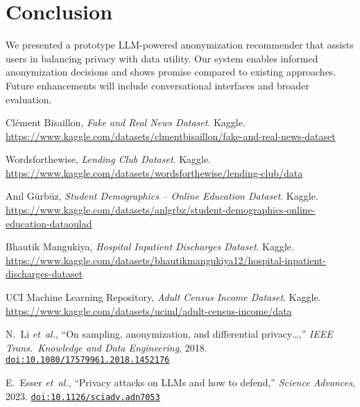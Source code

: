 \documentclass{article}
\begin{document}
\section{Conclusion}
We presented a prototype LLM-powered anonymization recommender that assists users in balancing privacy with data utility. Our system enables informed anonymization decisions and shows promise compared to existing approaches. Future enhancements will include conversational interfaces and broader evaluation.


\begin{thebibliography}{9}

Clément Bisaillon, 
\emph{Fake and Real News Dataset}. Kaggle. 
\href{https://www.kaggle.com/datasets/clmentbisaillon/fake-and-real-news-dataset}{https://www.kaggle.com/datasets/clmentbisaillon/fake-and-real-news-dataset}

Wordsforthewise, 
\emph{Lending Club Dataset}. Kaggle. 
\href{https://www.kaggle.com/datasets/wordsforthewise/lending-club/data}{https://www.kaggle.com/datasets/wordsforthewise/lending-club/data}

Anıl Gürbüz, 
\emph{Student Demographics – Online Education Dataset}. Kaggle. 
\href{https://www.kaggle.com/datasets/anlgrbz/student-demographics-online-education-dataoulad}{https://www.kaggle.com/datasets/anlgrbz/student-demographics-online-education-dataoulad}

Bhautik Mangukiya, 
\emph{Hospital Inpatient Discharges Dataset}. Kaggle. 
\href{https://www.kaggle.com/datasets/bhautikmangukiya12/hospital-inpatient-discharges-dataset}{https://www.kaggle.com/datasets/bhautikmangukiya12/hospital-inpatient-discharges-dataset}

UCI Machine Learning Repository, 
\emph{Adult Census Income Dataset}. Kaggle. 
\href{https://www.kaggle.com/datasets/uciml/adult-census-income/data}{https://www.kaggle.com/datasets/uciml/adult-census-income/data}

N.~Li \emph{et~al.},
“On sampling, anonymization, and differential privacy…,”
\emph{IEEE Trans.\ Knowledge and Data Engineering}, 2018.
\href{https://www.tandfonline.com/doi/full/10.1080/17579961.2018.1452176#abstract}{%
\texttt{doi:10.1080/17579961.2018.1452176}
}

E.~Esser \emph{et~al.},
“Privacy attacks on LLMs and how to defend,”
\emph{Science Advances}, 2023.
\href{https://www.science.org/doi/full/10.1126/sciadv.adn7053}{%
\texttt{doi:10.1126/sciadv.adn7053}
}

\end{thebibliography}
\end{document}
